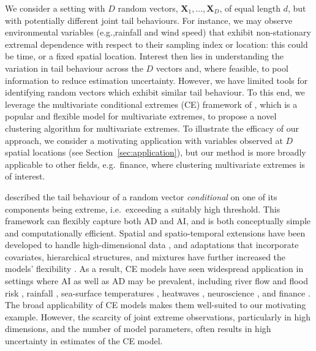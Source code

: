 \documentclass[preprint,12pt,authoryear]{elsarticle}
\begin{document}
We consider a setting with $D$ random vectors, $\boldsymbol{X}_1, \ldots, \boldsymbol{X}_D$, of equal length $d$, but with potentially different joint tail behaviours. 
For instance, we may observe environmental variables (e.g.,\@ rainfall and wind speed) that exhibit non-stationary extremal dependence with respect to their sampling index or location: this could be time, or a fixed spatial location. 
Interest then lies in understanding the variation in tail behaviour across the $D$ vectors and, where feasible, to pool information to reduce estimation uncertainty. 
However, we have limited tools for identifying random vectors which exhibit similar tail behaviour.
To this end, we leverage the multivariate conditional extremes (CE) framework of \citet{Heffernan2004}, which is a popular and flexible model for multivariate extremes, to propose a novel clustering algorithm for multivariate extremes.
To illustrate the efficacy of our approach, we consider a motivating application with variables observed at $D$ spatial locations (see Section~\ref{sec:application}), but our method is more broadly applicable to other fields, e.g.\ finance, where clustering multivariate extremes is of interest. 

\citet{Heffernan2004} described the tail behaviour of a random vector \emph{conditional} on one of its components being extreme, i.e.\ exceeding a suitably high threshold. 
This framework can flexibly capture both AD and AI, and is both conceptually simple and computationally efficient.
Spatial and spatio-temporal extensions have been developed to handle high-dimensional data \citep{Simpson2021, Wadsworth2022}, and adaptations that incorporate covariates, hierarchical structures, and mixtures have further increased the models' flexibility \citep{Richards2023, Tendijck2023, Talento2025}.
As a result, CE models have seen widespread application in settings where AI as well as AD may be prevalent, including river flow and flood risk \citep{Gilleland2013, Jane2020}, rainfall \citep{Richards2022}, sea-surface temperatures \citep{Simpson2023,Kakampakou2024}, heatwaves \citep{Winter2016}, neuroscience \citep{Guerrero2023, Talento2025}, and finance \citep{Hilal2014}. 
The broad applicability of CE models makes them well-suited to our motivating example.
However, the scarcity of joint extreme observations, particularly in high dimensions, and the number of model parameters, often results in high uncertainty in estimates of the CE model.
\end{document}
